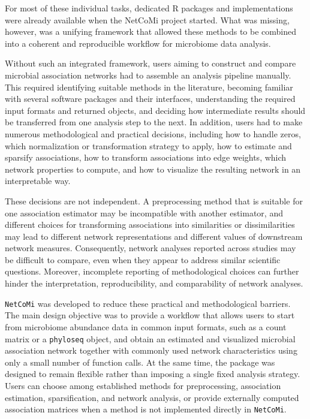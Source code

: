 For most of these individual tasks, dedicated R packages and implementations were already available when the NetCoMi project started. What was missing, however, was a unifying framework that allowed these methods to be combined into a coherent and reproducible workflow for microbiome data analysis.

Without such an integrated framework, users aiming to construct and compare microbial association networks had to assemble an analysis pipeline manually. This required identifying suitable methods in the literature, becoming familiar with several software packages and their interfaces, understanding the required input formats and returned objects, and deciding how intermediate results should be transferred from one analysis step to the next. In addition, users had to make numerous methodological and practical decisions, including how to handle zeros, which normalization or transformation strategy to apply, how to estimate and sparsify associations, how to transform associations into edge weights, which network properties to compute, and how to visualize the resulting network in an interpretable way.

These decisions are not independent. A preprocessing method that is suitable for one association estimator may be incompatible with another estimator, and different choices for transforming associations into similarities or dissimilarities may lead to different network representations and different values of downstream network measures. Consequently, network analyses reported across studies may be difficult to compare, even when they appear to address similar scientific questions. Moreover, incomplete reporting of methodological choices can further hinder the interpretation, reproducibility, and comparability of network analyses.

\texttt{NetCoMi} was developed to reduce these practical and methodological barriers. The main design objective was to provide a workflow that allows users to start from microbiome abundance data in common input formats, such as a count matrix or a \texttt{phyloseq} object, and obtain an estimated and visualized microbial association network together with commonly used network characteristics using only a small number of function calls. At the same time, the package was designed to remain flexible rather than imposing a single fixed analysis strategy. Users can choose among established methods for preprocessing, association estimation, sparsification, and network analysis, or provide externally computed association matrices when a method is not implemented directly in \texttt{NetCoMi}.

